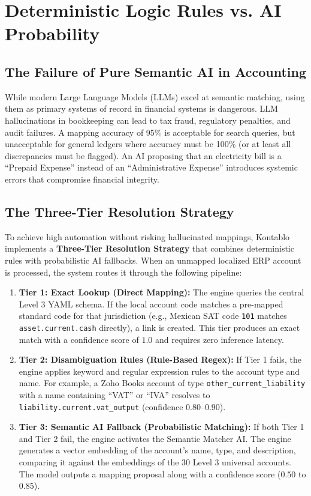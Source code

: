 \section{Deterministic Logic Rules vs. AI Probability}
\label{sec:deterministic}

\subsection{The Failure of Pure Semantic AI in Accounting}
While modern Large Language Models (LLMs) excel at semantic matching, using them as primary systems of record in financial systems is dangerous. LLM hallucinations in bookkeeping can lead to tax fraud, regulatory penalties, and audit failures. A mapping accuracy of 95\% is acceptable for search queries, but unacceptable for general ledgers where accuracy must be 100\% (or at least all discrepancies must be flagged). An AI proposing that an electricity bill is a ``Prepaid Expense'' instead of an ``Administrative Expense'' introduces systemic errors that compromise financial integrity.

\subsection{The Three-Tier Resolution Strategy}
To achieve high automation without risking hallucinated mappings, Kontablo implements a \textbf{Three-Tier Resolution Strategy} that combines deterministic rules with probabilistic AI fallbacks. When an unmapped localized ERP account is processed, the system routes it through the following pipeline:

\begin{enumerate}
    \item \textbf{Tier 1: Exact Lookup (Direct Mapping):} The engine queries the central Level 3 YAML schema. If the local account code matches a pre-mapped standard code for that jurisdiction (e.g., Mexican SAT code \texttt{101} matches \texttt{asset.current.cash} directly), a link is created. This tier produces an exact match with a confidence score of $1.0$ and requires zero inference latency.
    \item {\sloppy\textbf{Tier 2: Disambiguation Rules (Rule-Based Regex):} If Tier 1 fails, the engine applies keyword and regular expression rules to the account type and name. For example, a Zoho Books account of type \texttt{other\_current\_liability} with a name containing ``VAT'' or ``IVA'' resolves to \texttt{liability.current.vat\_output} (confidence $0.80$--$0.90$).\par}
    \item \textbf{Tier 3: Semantic AI Fallback (Probabilistic Matching):} If both Tier 1 and Tier 2 fail, the engine activates the Semantic Matcher AI. The engine generates a vector embedding of the account's name, type, and description, comparing it against the embeddings of the 30 Level 3 universal accounts. The model outputs a mapping proposal along with a confidence score ($0.50$ to $0.85$). 
\end{enumerate}

